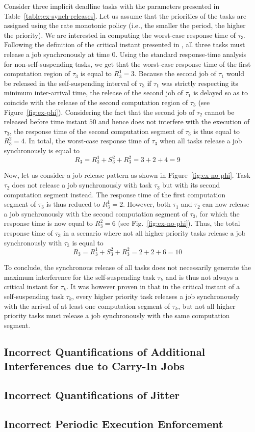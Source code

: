 Consider three implicit deadline tasks with the parameters presented in Table~\ref{table:ex-synch-releases}. Let us assume that the priorities of the tasks are assigned using the rate monotonic policy (i.e., the smaller the period, the higher the priority). We are interested in computing the worst-case response time of $\tau_3$. Following the definition of the critical instant presented in \cite{RTAS-LakshmananR10}, all three tasks must release a job synchronously at time $0$. Using the standard response-time analysis for non-self-suspending tasks, we get that the worst-case response time of the first computation region of $\tau_3$ is equal to $R_3^1 = 3$. Because the second job of $\tau_1$ would be released in the self-suspending interval of $\tau_3$ if $\tau_1$ was strictly respecting its minimum inter-arrival time, the release of the second job of $\tau_1$ is delayed so as to coincide with the release of the second computation region of $\tau_3$ (see Figure~\ref{fig:ex-phi}). Considering the fact that the second job of $\tau_2$ cannot be released before time instant $50$ and hence does not interfere with the execution of $\tau_3$, the response time of the second computation segment of $\tau_3$ is thus equal to $R_3^2=4$. In total, the worst-case response time of $\tau_3$ when all tasks release a job synchronously is equal to 
$$R_3 = R_3^1 + S_3^2 + R_3^2 = 3 + 2 +4 = 9$$

Now, let us consider a job release pattern as shown in Figure~\ref{fig:ex-no-phi}. Task $\tau_2$ does not release a job synchronously with task $\tau_3$ but with its second computation segment instead. The response time of the first computation segment of $\tau_3$ is thus reduced to $R_3^1=2$. However, both $\tau_1$ and $\tau_2$ can now release a job synchronously with the second computation segment of $\tau_3$, for which the response time is now equal to $R_3^2=6$ (see Fig.~\ref{fig:ex-no-phi}). Thus, the total response time of $\tau_3$ in a scenario where not all higher priority tasks release a job synchronously with $\tau_3$ is equal to 
$$R_3 = R_3^1 + S_3^2 + R_3^2 = 2+2+6 = 10$$

To conclude, the synchronous release of all tasks does not necessarily generate the maximum interference for the self-suspending task $\tau_k$ and is thus not always a critical instant for $\tau_k$. It was however proven in \cite{ecrts15nelissen} that in the critical instant of a self-suspending task $\tau_k$, every higher priority task releases a job synchronously with the arrival of at least one computation segment of $\tau_k$, but not all higher priority tasks must release a job synchronously with the same computation segment.

\subsection{Incorrect Quantifications of Additional Interferences due to Carry-In Jobs}
\label{sec:wrong-carryin}

\subsection{Incorrect Quantifications of Jitter}
\label{sec:wrong-jitter}


\subsection{Incorrect Periodic Execution Enforcement}
\label{sec:wrong-periodic}


